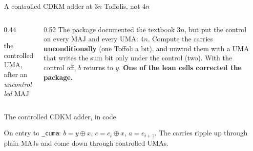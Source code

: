 \documentclass[aspectratio=169,11pt]{beamer}
\newcommand{\code}[2][]{}
\newcommand{\oplusat}[2]{\draw[thick,color=body] (#1,#2) circle (1.6mm);
  \draw[thick,color=body] (#1-0.16,#2) -- (#1+0.16,#2); \draw[thick,color=body] (#1,#2-0.16) -- (#1,#2+0.16);}
\begin{document}
\begin{frame}{A controlled CDKM adder at $3n$ Toffolis, not $4n$}
  \begin{columns}[c]
    \begin{column}{0.44\textwidth}
      \centering
      \par
      \vskip1mm
      {\scriptsize the controlled UMA, after an \emph{uncontrolled} MAJ}
    \end{column}
    \begin{column}{0.52\textwidth}
      \small The package documented the textbook $3n$, but put the control on every MAJ and every UMA: $4n$.
      \vskip2mm
      Compute the carries \textbf{unconditionally} (one Toffoli a bit), and unwind them with a UMA that writes the sum bit only under the control (two). With the control off, $b$ returns to $y$.
      \vskip2mm
      {\color{cverm}\bfseries One of the lean cells corrected the package.}
    \end{column}
  \end{columns}
\end{frame}

\begin{frame}[fragile]{The controlled CDKM adder, in code}
  \code[basicstyle=\ttfamily\scriptsize]{cdkm_cadd.py}
  \vskip2mm
  {\small On entry to \texttt{\_cuma}: $b=y\oplus x$, $c=c_i\oplus x$, $a=c_{i+1}$. The carries ripple up through plain MAJs and come down through controlled UMAs.}
\end{frame}
\end{document}
